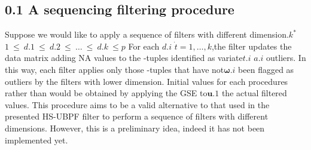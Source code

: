 \documentclass{article}
\begin{document}
\subsection*{0.1  A sequencing filtering procedure}


Suppose we would like to apply a sequence of filters with different dimension.$k ^ { * }$
$1 ~ \leq ~ d . { 1 } ~ \leq ~ d . { 2 } ~ \leq ~ \dots ~ \leq ~ d . { k } ~ \leq p$ For each $d . { i }$ $\dot { t } = 1, \dots, k$,the filter updates
the data matrix adding NA values to the -tuples identified as variate$t . { i }$ $a . { i }$
outliers. In this way, each filter applies only those  -tuples that have not$\boldsymbol { \omega } . { i }$
been flagged as outliers by the filters with lower dimension. Initial values for
each procedures rather than  would be obtained by applying the GSE to$\boldsymbol { u } . { 1 }$
the actual filtered values. This procedure aims to be a valid alternative to
that used in the presented HS-UBPF filter to perform a sequence of filters
with different dimensions. However, this is a preliminary idea, indeed it has
not been implemented yet.
\end{document}
